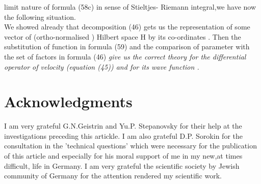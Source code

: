 \documentclass[a4paper,12pt] {article}
\begin{document}
 limit nature of formula (58c) in sense of  Stieltjes- Riemann  integral,we have now the following
situation. \\ We showed already that decomposition (46) gets us the representation of some vector
 \myHighlight{$\tilde \Psi$}\coordHE{}  of (ortho-normalised ) Hilbert space H
by its co-ordinates \coordHE{}. Then the substitution of function \myHighlight{$\tilde\Psi$}\coordHE{}  in  formula   (59) and
the comparison of parameter  \myHighlight{$ \lambda$}\coordHE{}  with the set of factors \coordHE{} in formula (46)  \it  give  us the
 correct theory for the differential operator of velocity \rm (equation (45))  \it and for its wave function
\rm \myHighlight{$\tilde \Psi$}\coordHE{}.
 \section *{Acknowledgments} I am very grateful G.N.Geistrin and Yu.P. Stepanovsky for their help at
 the investigations preceding this artickle.
I am also grateful D.P. Sorokin for the consultation in the 'technical questions' which were
 necessary for the publication of this article and especially for his moral support of me in my new,at
times difficult, life in Germany.
I am very grateful the scientific society by Jewish community of Germany for the attention rendered my
scientific work.
\end{document}
